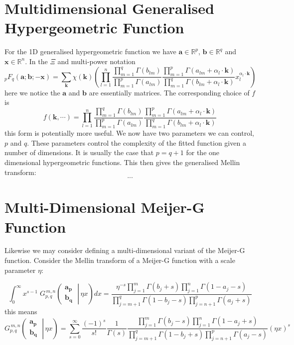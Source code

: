 \documentclass{article}
\begin{document}
\section{Multidimensional Generalised Hypergeometric Function}
For the 1D generalised hypergeometric function we have $\mathbf{a} \in \mathbb{R}^p$, $\mathbf{b} \in \mathbb{R}^q$ and $\mathbf{x} \in \mathbb{R}^n$. In the $\Xi$ and multi-power notation
\begin{equation}
_pF_q(\mathbf{a};\mathbf{b};-\mathbf{x}) = \sum_{\mathbf{k}}\chi(\mathbf{k})     \left(\prod_{l=1}^n \frac{\prod_{m=1}^q \Gamma(b_{lm})}{\prod_{m=1}^p \Gamma(a_{lm})} \frac{\prod_{m=1}^p \Gamma(a_{lm} + \alpha_l \cdot \mathbf{k})}{\prod_{m=1}^q \Gamma(b_{lm} + \alpha_l \cdot \mathbf{k})} x_l^{\alpha_l \cdot \mathbf{k}}\right)
\end{equation}
here we notice the $\mathbf{a}$ and $\mathbf{b}$ are essentially matrices. The corresponding choice of $f$ is
\begin{equation}
f(\mathbf{k},\cdots) = \prod_{l=1}^n \frac{\prod_{m=1}^q \Gamma(b_{lm})}{\prod_{m=1}^p \Gamma(a_{lm})} \frac{\prod_{m=1}^p \Gamma(a_{lm} + \alpha_l \cdot \mathbf{k})}{\prod_{m=1}^q \Gamma(b_{lm} + \alpha_l \cdot \mathbf{k})}
\end{equation}
this form is potentially more useful. We now have two parameters we can control, $p$ and $q$. These parameters control the complexity of the fitted function given a number of dimensions. It is usually the case that $p=q+1$ for the one dimensional hypergeometric functions. This then gives the generalised Mellin transform:
$$
...
$$

\section{Multi-Dimensional Meijer-G Function}
Likewise we may consider defining a multi-dimensional variant of the Meijer-G function. Consider the Mellin transform of a Meijer-G function with a scale parameter $\eta$:

\begin{equation}
\int_0^{\infty} x^{s - 1} \; G_{p,q}^{\,m,n} \!\left( \left. \begin{matrix} \mathbf{a_p} \\ \mathbf{b_q} \end{matrix} \; \right| \, \eta x \right) dx =
\frac{\eta^{-s} \prod_{j = 1}^{m} \Gamma (b_j + s) \prod_{j = 1}^{n} \Gamma (1 - a_j - s)} {\prod_{j = m + 1}^{q} \Gamma (1 - b_j - s) \prod_{j = n + 1}^{p} \Gamma (a_j + s)}
\end{equation}
this means
\begin{equation}
G_{p,q}^{\,m,n} \!\left( \left. \begin{matrix} \mathbf{a_p} \\ \mathbf{b_q} \end{matrix} \; \right| \, \eta x \right) = \sum_{s=0}^\infty \frac{(-1)^s}{s!} \frac{1}{\Gamma(s)} \frac{\prod_{j = 1}^{m} \Gamma (b_j - s) \prod_{j = 1}^{n} \Gamma (1 - a_j + s)} {\prod_{j = m + 1}^{q} \Gamma (1 - b_j + s) \prod_{j = n + 1}^{p} \Gamma (a_j - s)} (\eta x)^s
\end{equation}
\end{document}
